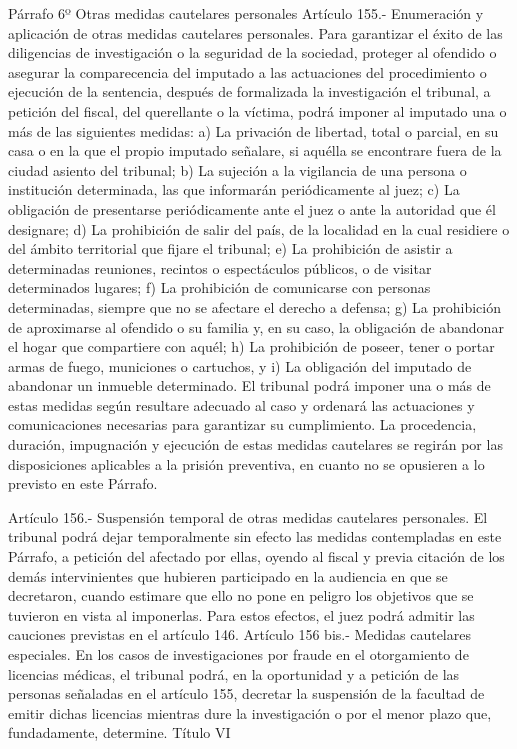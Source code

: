     Párrafo 6º Otras medidas cautelares personales
    Artículo 155.- Enumeración y aplicación de otras medidas cautelares personales. Para garantizar el éxito de las diligencias de investigación o la seguridad de la sociedad, proteger al ofendido o asegurar la comparecencia del imputado a las actuaciones del procedimiento o ejecución de la sentencia, después de formalizada la investigación el tribunal, a petición del fiscal, del querellante o la víctima, podrá imponer al imputado una o más de las siguientes medidas:
    a) La privación de libertad, total o parcial, en su casa o en la que el propio imputado señalare, si aquélla se encontrare fuera de la ciudad asiento del tribunal;
    b) La sujeción a la vigilancia de una persona o institución determinada, las que informarán periódicamente al juez;
    c) La obligación de presentarse periódicamente ante el juez o ante la autoridad que él designare;
    d) La prohibición de salir del país, de la localidad en la cual residiere o del ámbito territorial que fijare el tribunal;
    e) La prohibición de asistir a determinadas reuniones, recintos o espectáculos públicos, o de visitar determinados lugares;
    f) La prohibición de comunicarse con personas determinadas, siempre que no se afectare el derecho a defensa;
    g) La prohibición de aproximarse al ofendido o su familia y, en su caso, la obligación de abandonar el hogar que compartiere con aquél;
    h) La prohibición de poseer, tener o portar armas de fuego, municiones o cartuchos, y
    i) La obligación del imputado de abandonar un inmueble determinado.
    El tribunal podrá imponer una o más de estas medidas según resultare adecuado al caso y ordenará las actuaciones y comunicaciones necesarias para garantizar su cumplimiento.
    La procedencia, duración, impugnación y ejecución de estas medidas cautelares se regirán por las disposiciones aplicables a la prisión preventiva, en cuanto no se opusieren a lo previsto en este Párrafo.




    Artículo 156.- Suspensión temporal de otras medidas cautelares personales. El tribunal podrá dejar temporalmente sin efecto las medidas contempladas en este Párrafo, a petición del afectado por ellas, oyendo al fiscal y previa citación de los demás intervinientes que hubieren participado en la audiencia en que se decretaron, cuando estimare que ello no pone en peligro los objetivos que se tuvieron en vista al imponerlas. Para estos efectos, el juez podrá admitir las cauciones previstas en el artículo 146.
    Artículo 156 bis.- Medidas  cautelares especiales. En los casos de investigaciones por fraude en el otorgamiento de licencias médicas, el tribunal podrá, en la oportunidad y a petición de las personas señaladas en el artículo 155, decretar la suspensión de la facultad de emitir dichas licencias mientras dure la investigación o por el menor plazo que, fundadamente, determine.
    Título VI

